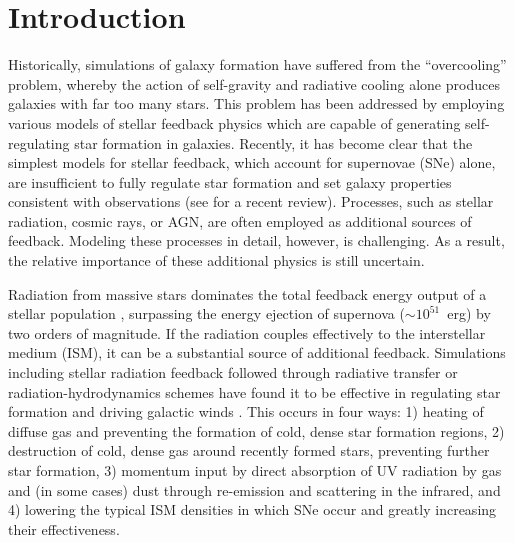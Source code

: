 \documentclass[twocolumn]{aastex62}
\begin{document}
\section{Introduction} \label{sec:intro}
Historically, simulations of galaxy formation have suffered from the ``overcooling'' problem, whereby the action of self-gravity and radiative cooling alone produces galaxies with far too many stars. This problem has been addressed by employing various models of stellar feedback physics which are capable of generating self-regulating star formation in galaxies. Recently, it has become clear that the simplest models for stellar feedback, which account for supernovae (SNe) alone, are insufficient \citep{Smith2018} to fully regulate star formation and set galaxy properties consistent with observations (see \cite{NaabOstriker2017} for a recent review). Processes, such as stellar radiation, cosmic rays, or AGN, are often employed as additional sources of feedback. Modeling these processes in detail, however, is challenging. As a result, the relative importance of these additional physics is still uncertain.

Radiation from massive stars dominates the total feedback energy output of a stellar population \citep[e.g.][]{Abbott1982,Leitherer1999,Agertz2013}, surpassing the energy ejection of supernova ($\sim 10^{51}$~erg) by two orders of magnitude. If the radiation couples effectively to the interstellar medium (ISM), it can be a substantial source of additional feedback. %
Simulations including stellar radiation feedback followed through radiative transfer or radiation-hydrodynamics schemes have found it to be effective in regulating star formation and driving galactic winds \citep[e.g.][]{WiseAbel2012,Kim2013a,Sales2014,Oshea2015,Rosdahl2015,Ocvirk2015,Pawlik2015,Peters2017}. This occurs in four ways: 1) heating of diffuse gas and preventing the formation of cold, dense star formation regions, 2) destruction of cold, dense gas around recently formed stars, preventing further star formation, 3) momentum input by direct absorption of UV radiation by gas and (in some cases) dust through re-emission and scattering in the infrared, and 4) lowering the typical ISM densities in which SNe occur and greatly increasing their effectiveness. %
\end{document}
